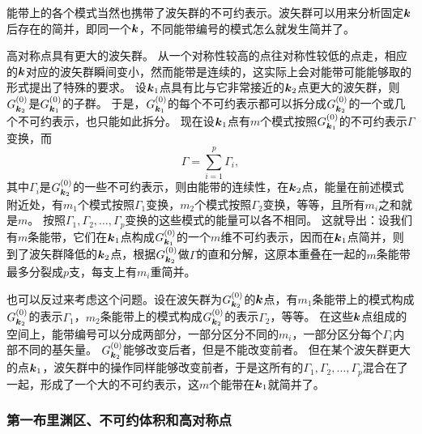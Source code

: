 能带上的各个模式当然也携带了波矢群的不可约表示。波矢群可以用来分析固定$\vb*{k}$后存在的简并，即同一个$\vb*{k}$，不同能带编号的模式怎么就发生简并了。

高对称点具有更大的波矢群。
从一个对称性较高的点往对称性较低的点走，相应的$\vb*{k}$对应的波矢群瞬间变小，然而能带是连续的，这实际上会对能带可能能够取的形式提出了特殊的要求。
设$\vb*{k}_1$点具有比与它非常接近的$\vb*{k}_2$点更大的波矢群，则$G_{\vb*{k}_2}^{(0)}$是$G_{\vb*{k}_1}^{(0)}$的子群。
于是，$G_{\vb*{k}_1}^{(0)}$的每个不可约表示都可以拆分成$G_{\vb*{k}_2}^{(0)}$的一个或几个不可约表示，也只能如此拆分。
现在设$\vb*{k}_1$点有$m$个模式按照$G_{\vb*{k}_1}^{(0)}$的不可约表示$\Gamma$变换，而
\begin{equation}
    \Gamma = \sum_{i=1}^p \Gamma_i,
    \label{eq:k1-k2-decomposition}
\end{equation}
其中$\Gamma_i$是$G_{\vb*{k}_2}^{(0)}$的一些不可约表示，则由能带的连续性，在$\vb*{k}_2$点，能量在前述模式附近处，有$m_1$个模式按照$\Gamma_1$变换，$m_2$个模式按照$\Gamma_2$变换，等等，且所有$m_i$之和就是$m$。
按照$\Gamma_1, \Gamma_2, \ldots, \Gamma_p$变换的这些模式的能量可以各不相同。
这就导出：设我们有$m$条能带，它们在$\vb*{k}_1$点构成$G_{\vb*{k}_1}^{(0)}$的一个$m$维不可约表示，因而在$\vb*{k}_1$点简并，则到了波矢群降低的$\vb*{k}_2$点，根据$G_{\vb*{k}_2}^{(0)}$做$\Gamma$的直和分解，这原本重叠在一起的$m$条能带最多分裂成$p$支，每支上有$m_i$重简并。

也可以反过来考虑这个问题。设在波矢群为$G_{\vb*{k}_2}^{(0)}$的$\vb*{k}$点，有$m_1$条能带上的模式构成$G_{\vb*{k}_2}^{(0)}$的表示$\Gamma_1$，$m_2$条能带上的模式构成$G_{\vb*{k}_2}^{(0)}$的表示$\Gamma_2$，等等。
在这些$\vb*{k}$点组成的空间上，能带编号可以分成两部分，一部分区分不同的$m_i$，一部分区分每个$\Gamma_i$内部不同的基矢量。
$G_{\vb*{k}_2}^{(0)}$能够改变后者，但是不能改变前者。
但在某个波矢群更大的点$\vb*{k}_1$，波矢群中的操作同样能够改变前者，于是这所有的$\Gamma_1, \Gamma_2, \ldots, \Gamma_p$混合在了一起，形成了一个大的不可约表示，这$m$个能带在$\vb*{k}_1$就简并了。

\subsubsection{第一布里渊区、不可约体积和高对称点} 

